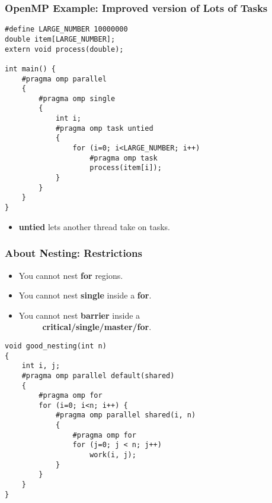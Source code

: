 \documentclass[aspectratio=43]{beamer}
\newenvironment{changemargin}[1]{%
  \begin{list}{}{%
    \setlength{\topsep}{0pt}%
    \setlength{\leftmargin}{#1}%
    \setlength{\rightmargin}{1em}
    \setlength{\listparindent}{\parindent}%
    \setlength{\itemindent}{\parindent}%
    \setlength{\parsep}{\parskip}%
  }%
  \item[]}{\end{list}}
\begin{document}
\begin{frame}[fragile]
  \frametitle{OpenMP Example: Improved version of Lots of Tasks}

  \begin{changemargin}{1.5cm}
  \begin{lstlisting}
#define LARGE_NUMBER 10000000
double item[LARGE_NUMBER];
extern void process(double);

int main() {
    #pragma omp parallel
    {
        #pragma omp single
        {
            int i;
            #pragma omp task untied
            {
                for (i=0; i<LARGE_NUMBER; i++)
                    #pragma omp task
                    process(item[i]);
            }
        }
    }
}
  \end{lstlisting}
  
  \begin{itemize}
    \item {\bf untied} lets another thread take on tasks.
  \end{itemize}
  \end{changemargin}
\end{frame}

\begin{frame}[fragile]
  \frametitle{About Nesting: Restrictions}

  \begin{changemargin}{1.5cm}
  \begin{itemize}
    \item You cannot nest {\bf for} regions.
    \item You cannot nest {\bf single} inside a {\bf for}.
    \item You cannot nest {\bf barrier} inside a\\~~~~~ {\bf critical/single/master/for}.
  \end{itemize}

  \begin{lstlisting}
void good_nesting(int n)
{
    int i, j;
    #pragma omp parallel default(shared)
    {
        #pragma omp for
        for (i=0; i<n; i++) {
            #pragma omp parallel shared(i, n)
            {
                #pragma omp for
                for (j=0; j < n; j++)
                    work(i, j);
            }
        }
    }
}
  \end{lstlisting}
  \end{changemargin}
\end{frame}
\end{document}
